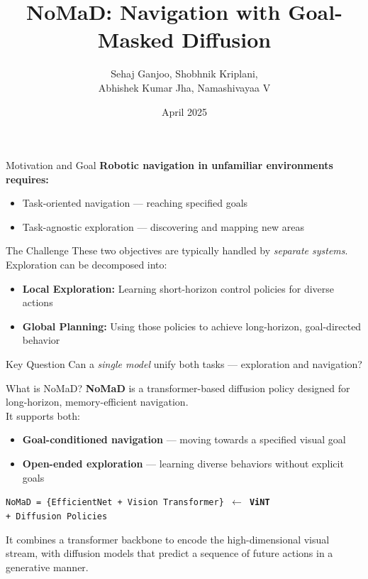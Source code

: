 \documentclass{beamer}
\title[NoMaD]{NoMaD: \textbf{N}avigati\textbf{o}n with Goal-\textbf{Ma}sked \textbf{D}iffusion}
\author{Sehaj Ganjoo, Shobhnik Kriplani, \\ Abhishek Kumar Jha, Namashivayaa V}
\institute{IISc Bengaluru \newline BTech. Mathematics and Computing}
\date{April 2025}
\begin{document}
\begin{frame}
\titlepage
\end{frame}

\begin{frame}{Motivation and Goal}
    \textbf{Robotic navigation in unfamiliar environments requires:}
    \begin{itemize}
        \item Task-oriented navigation — reaching specified goals
        \item Task-agnostic exploration — discovering and mapping new areas
    \end{itemize}
    \pause
    \begin{block}{The Challenge}
        These two objectives are typically handled by \textit{separate systems}.\\[1ex]
        Exploration can be decomposed into:
        \begin{itemize}
            \item \textbf{Local Exploration:} Learning short-horizon control policies for diverse actions
            \item \textbf{Global Planning:} Using those policies to achieve long-horizon, goal-directed behavior
        \end{itemize}
    \end{block}
    \pause
    \begin{block}{Key Question}
        Can a \textit{single model} unify both tasks — exploration and navigation?
    \end{block}
    \end{frame}
    \begin{frame}{What is NoMaD?}
        \textbf{NoMaD} is a transformer-based diffusion policy designed for long-horizon, memory-efficient navigation.\\[0.5em]
        It supports both:
        \begin{itemize}
            \item \textbf{Goal-conditioned navigation} — moving towards a specified visual goal
            \item \textbf{Open-ended exploration} — learning diverse behaviors without explicit goals
        \end{itemize}
        \pause
        \bigskip
        \texttt{NoMaD = \{EfficientNet + Vision Transformer\} $\leftarrow$ \textbf{ViNT} \\+ Diffusion Policies}
        \pause
        \bigskip
        \begin{block}{}
            It combines a transformer backbone to encode the high-dimensional visual stream, with diffusion models that predict a sequence of future actions in a generative manner.
        \end{block}
        \end{frame}
\end{document}
